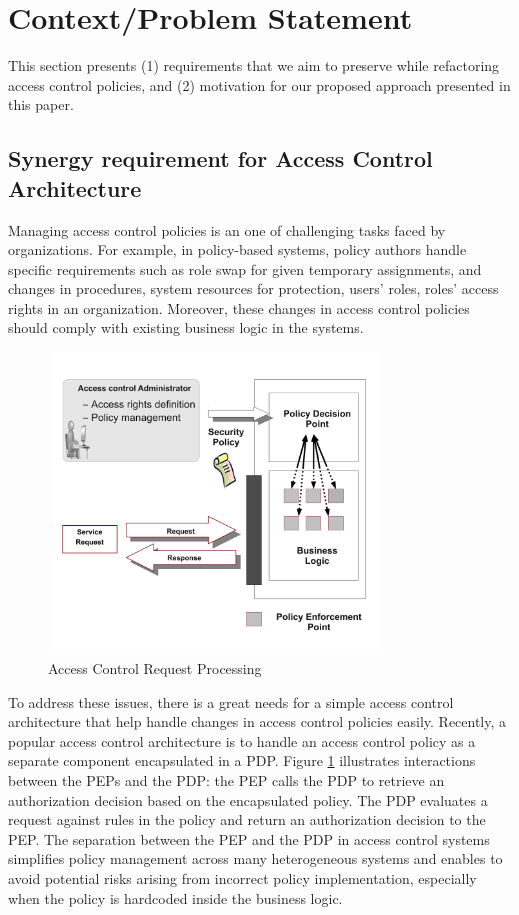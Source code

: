 



\section{Context/Problem Statement} \label{sec:context}
This section presents (1) requirements that we aim to 
preserve while refactoring access control policies, and (2) motivation for our proposed approach presented in this paper.

\subsection{Synergy requirement for Access Control Architecture}

Managing access control policies is an one of challenging tasks faced by organizations. 
For example, in policy-based systems, policy authors handle specific 
requirements such as role swap for given temporary assignments, and changes in procedures, 
system resources for protection, users' roles, roles' access rights in an organization.
Moreover, these changes in access control policies should comply with existing business logic in the systems.

\begin{figure}[t]
\begin{center}
\includegraphics[width=9cm, height=8cm]{business-logic}
\caption{Access Control Request Processing}
\label{pep-pdp}
\end{center}
\end{figure}

To address these issues, there is a great needs for
a simple access control architecture that help handle changes in access control policies easily.
Recently, a popular access control architecture is to handle an access control policy as a separate component 
encapsulated in a PDP. Figure \ref{pep-pdp} illustrates interactions between the PEPs and the PDP: the PEP calls the PDP to 
retrieve an authorization decision based on the encapsulated policy. The PDP evaluates a request against rules in the policy
and return an authorization decision to the PEP.
The separation between the PEP and the PDP in access control systems simplifies policy management across many heterogeneous systems and enables to avoid potential risks arising from incorrect policy implementation, especially when the policy is hardcoded inside the business logic.


